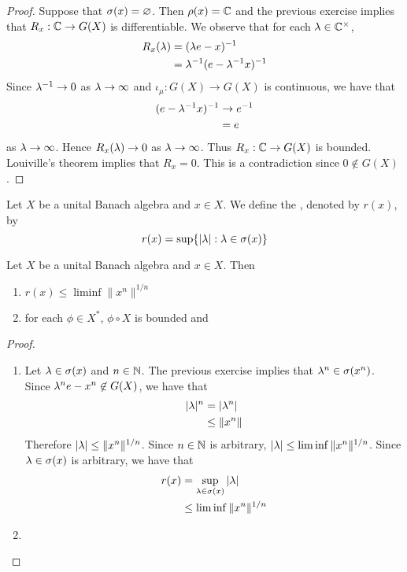 \documentclass{book}
\begin{document}
\begin{proof}
	Suppose that $\sigma(x) = \varnothing$. Then $\rho(x) = \mathbb{C}$ and the previous exercise implies that $R_x: \mathbb{C} \rightarrow G(X)$ is differentiable. We observe that for each $\lambda \in \mathbb{C}^{\times}$, 
	\begin{align*}
		R_x(\lambda)
		& = (\lambda e - x)^{-1} \\
		& = \lambda^{-1} (e - \lambda^{-1}x)^{-1} \\
	\end{align*} 
	Since $\lambda^{-1} \rightarrow 0$ as $\lambda \rightarrow \infty$ and $\iota_{\mu}: G(X) \rightarrow G(X)$ is continuous, we have that
	\begin{align*}
		(e - \lambda^{-1}x)^{-1}
		& \rightarrow e^{-1} \\
		&= e
	\end{align*}
	as $\lambda \rightarrow \infty$. Hence $R_x(\lambda) \rightarrow 0$ as $\lambda \rightarrow \infty$. Thus $R_x: \mathbb{C} \rightarrow G(X)$ is bounded. Louiville's theorem implies that $R_x = 0$. This is a contradiction since $0 \not \in G(X)$.   
\end{proof}

	\begin{defn}
		Let $X$ be a unital Banach algebra and $x \in X$. We define the , denoted by $r(x)$, by $$r(x) = \sup \{|\lambda|: \lambda \in \sigma(x)\}$$
	\end{defn}

	\begin{ex}
		Let $X$ be a unital Banach algebra and $x \in X$. Then
		\begin{enumerate}
			\item $r(x) \leq \liminf \|x^n\|^{1/n}$
			\item for each $\phi \in X^*$, $\phi \circ X$ is bounded and 
		\end{enumerate}
	\end{ex}

	\begin{proof}\
		\begin{enumerate}
			\item Let $\lambda \in \sigma(x)$ and $n \in \mathbb{N}$. The previous exercise implies that $\lambda^n \in \sigma(x^n)$. Since $\lambda^ne - x^n \not \in G(X)$, we have that
			\begin{align*}
				|\lambda|^n
				& = |\lambda^n| \\
				& \leq \|x^n\|
			\end{align*}
			Therefore $|\lambda| \leq \|x^n\|^{1/n}$. Since $n \in \mathbb{N}$ is arbitrary, $|\lambda| \leq \liminf \|x^n\|^{1/n}$. Since $\lambda \in \sigma(x)$ is arbitrary, we have that 
			\begin{align*}
				r(x)
				& = \sup_{\lambda \in \sigma(x)} |\lambda| \\
				& \leq \liminf \|x^n\|^{1/n}
			\end{align*} 
			\item 
		\end{enumerate}
	\end{proof}
	
\end{document}
